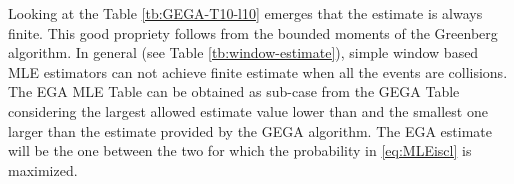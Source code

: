 \documentclass[11pt,a4paper,twoside,openright]{book}
\begin{document}
\begin{table}[htbp]
\centering
{}
\caption{\emph{GEGA}: Possible estimates when $T=10$ and $l=10$.}
\label{tb:GEGA-T10-l10}
\end{table}

Looking at the Table \ref{tb:GEGA-T10-l10} emerges that the estimate is always finite. This good propriety  follows from the bounded moments of the Greenberg algorithm. In general (see Table \ref{tb:window-estimate}), simple window based MLE estimators can not achieve finite estimate when all the events are collisions.\\

The EGA MLE Table can be obtained as sub-case from the GEGA Table considering the largest allowed estimate value lower than and the smallest one larger than the estimate provided by the GEGA algorithm. The EGA estimate will be the one between the two for which the probability in \eqref{eq:MLEiscl} is maximized.\\
\end{document}
